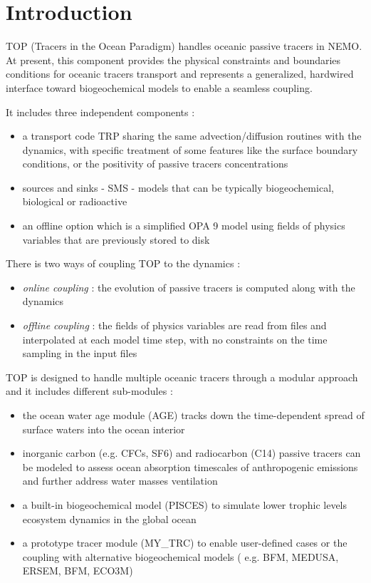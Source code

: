 
\chapter*{Introduction}

TOP (Tracers in the Ocean Paradigm) handles oceanic passive tracers in NEMO. At present, this component provides the physical constraints and boundaries conditions for oceanic tracers transport and represents a generalized, hardwired interface toward biogeochemical models to enable a seamless coupling.

It includes three independent components :

\begin{itemize}
        \item a transport code TRP sharing the same advection/diffusion routines with the dynamics, with specific treatment of some features like the surface boundary
conditions, or the positivity of passive tracers concentrations
        \item sources and sinks - SMS - models that can be typically biogeochemical, biological or radioactive
        \item an offline option which is a simplified OPA 9 model using fields of physics variables that are previously stored to disk
\end{itemize}

There is two ways of coupling TOP to the dynamics :

\begin{itemize}
        \item \textit{online coupling} : the evolution of passive tracers is computed along with the dynamics
        \item \textit{offline coupling} : the fields of physics variables are read from files and interpolated at each model time step, with no constraints on the time sampling in the input files
\end{itemize}

TOP is designed to handle multiple oceanic tracers through a modular approach and it includes different sub-modules :

\begin{itemize}
        \item the ocean water age module (AGE) tracks down the time-dependent spread of surface waters into the ocean interior
        \item inorganic carbon (e.g. CFCs, SF6) and radiocarbon (C14) passive tracers can be modeled to assess ocean absorption timescales of anthropogenic emissions and further address water masses ventilation
        \item a built-in biogeochemical model (PISCES) to simulate lower trophic levels ecosystem dynamics in the global ocean
        \item a prototype tracer module (MY\_TRC) to enable user-defined cases or the coupling with alternative biogeochemical models ( e.g. BFM, MEDUSA, ERSEM, BFM, ECO3M)
\end{itemize}


